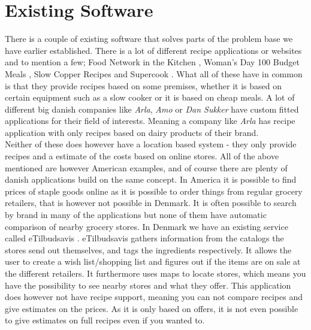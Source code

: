 \section{Existing Software}
\label{sec:exsoft}

There is a couple of existing software that solves parts of the problem base we have earlier established. There is a lot of different recipe applications or websites and to mention a few;  Food Network in the Kitchen \cite{recipe_FN}, Woman's Day 100 Budget Meals \cite{recipe_woman}, Slow Copper Recipes \cite{recipe_SC} and Supercook \cite{recipe_supercook}. What all of these have in common is that they provide recipes based on some premises, whether it is based on certain equipment such as a slow cooker or it is based on cheap meals. A lot of different big danish companies like \textit{Arla}, \textit{Amo} or \textit{Dan Sukker} have custom fitted applications for their field of interests. Meaning a company like \textit{Arla} has recipe application with only recipes based on dairy products of their brand.\\
 Neither of these does however have a location based system - they only provide recipes and a estimate of the costs based on online stores. All of the above mentioned are however American examples, and of course there are plenty of danish applications build on the same concept. In America it is possible to find prices of staple goods online as it is possible to order things from regular grocery retailers, that is however not possible in Denmark. It is often possible to search by brand in many of the applications but none of them have automatic comparison of nearby grocery stores. In Denmark we have an existing service called eTilbudsavis \cite{etilbudsavis}. eTilbudsavis gathers information from the catalogs the stores send out themselves, and tags the ingredients respectively. It allows the user to create a wish list/shopping list and figures out if the items are on sale at the different retailers. It furthermore uses maps to locate stores, which means you have the possibility to see nearby stores and what they offer. This application does however not have recipe support, meaning you can not compare recipes and give estimates on the prices. As it is only based on offers, it is not even possible to give estimates on full recipes even if you wanted to.
